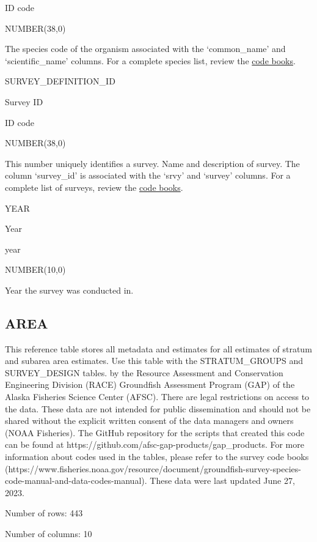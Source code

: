 \documentclass[
  letterpaper,
  oneside,
  open=any]{scrbook}
\begin{document}
ID code

NUMBER(38,0)

The species code of the organism associated with the `common\_name' and
`scientific\_name' columns. For a complete species list, review the
\href{https://www.fisheries.noaa.gov/resource/document/groundfish-survey-species-code-manual-and-data-codes-manual}{code
books}.

SURVEY\_DEFINITION\_ID

Survey ID

ID code

NUMBER(38,0)

This number uniquely identifies a survey. Name and description of
survey. The column `survey\_id' is associated with the `srvy' and
`survey' columns. For a complete list of surveys, review the
\href{https://www.fisheries.noaa.gov/resource/document/groundfish-survey-species-code-manual-and-data-codes-manual}{code
books}.

YEAR

Year

year

NUMBER(10,0)

Year the survey was conducted in.

\hypertarget{area}{%
\subsection{AREA}\label{area}}

This reference table stores all metadata and estimates for all estimates
of stratum and subarea area estimates. Use this table with the
STRATUM\_GROUPS and SURVEY\_DESIGN tables. by the Resource Assessment
and Conservation Engineering Division (RACE) Groundfish Assessment
Program (GAP) of the Alaska Fisheries Science Center (AFSC). There are
legal restrictions on access to the data. These data are not intended
for public dissemination and should not be shared without the explicit
written consent of the data managers and owners (NOAA Fisheries). The
GitHub repository for the scripts that created this code can be found at
https://github.com/afsc-gap-products/gap\_products. For more information
about codes used in the tables, please refer to the survey code books
(https://www.fisheries.noaa.gov/resource/document/groundfish-survey-species-code-manual-and-data-codes-manual).
These data were last updated June 27, 2023.

Number of rows: 443

Number of columns: 10
\end{document}
